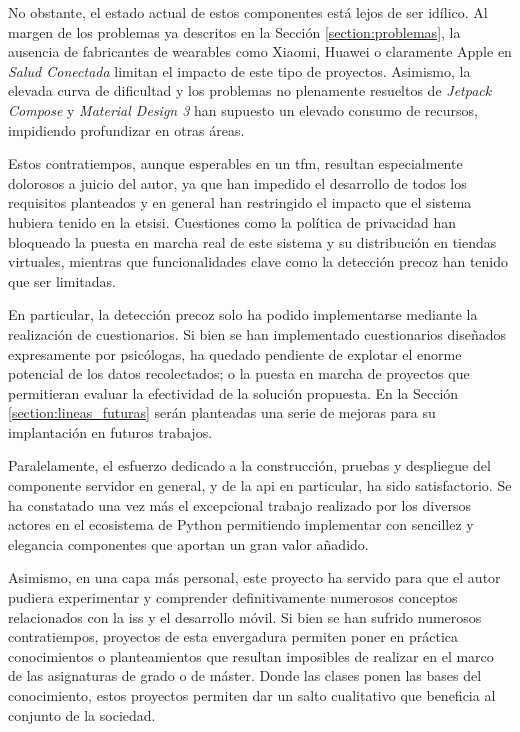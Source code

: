     No obstante, el estado actual de estos componentes está lejos de ser idílico. Al margen de los problemas ya descritos en la Sección \ref{section:problemas}, la ausencia de fabricantes de \glspl{wearable} como Xiaomi, Huawei o claramente Apple en \textit{Salud Conectada} limitan el impacto de este tipo de proyectos. Asimismo, la elevada curva de dificultad y los problemas no plenamente resueltos de \textit{Jetpack Compose} y \textit{Material Design 3} han supuesto un elevado consumo de recursos, impidiendo profundizar en otras áreas.

    Estos contratiempos, aunque esperables en un \gls{tfm}, resultan especialmente dolorosos a juicio del autor, ya que han impedido el desarrollo de todos los requisitos planteados y en general han restringido el impacto que el sistema hubiera tenido en la \gls{etsisi}. Cuestiones como la política de privacidad han bloqueado la puesta en marcha real de este sistema y su distribución en tiendas virtuales, mientras que funcionalidades clave como la detección precoz han tenido que ser limitadas.
    
    En particular, la detección precoz solo ha podido implementarse mediante la realización de cuestionarios. Si bien se han implementado cuestionarios diseñados expresamente por psicólogas, ha quedado pendiente de explotar el enorme potencial de los datos recolectados; o la puesta en marcha de proyectos que permitieran evaluar la efectividad de la solución propuesta. En la Sección \ref{section:lineas_futuras} serán planteadas una serie de mejoras para su implantación en futuros trabajos.

    Paralelamente, el esfuerzo dedicado a la construcción, pruebas y despliegue del componente servidor en general,  y de la \gls{api} en particular, ha sido satisfactorio. Se ha constatado una vez más el excepcional trabajo realizado por los diversos actores en el ecosistema de Python permitiendo implementar con sencillez y elegancia componentes que aportan un gran valor añadido.

    Asimismo, en una capa más personal, este proyecto ha servido para que el autor pudiera experimentar y comprender definitivamente numerosos conceptos relacionados con la \gls{iss} y el desarrollo móvil. Si bien se han sufrido numerosos contratiempos, proyectos de esta envergadura permiten poner en práctica conocimientos o planteamientos que resultan imposibles de realizar en el marco de las asignaturas de grado o de máster. Donde las clases ponen las bases del conocimiento, estos proyectos permiten dar un salto cualitativo que beneficia al conjunto de la sociedad. 

